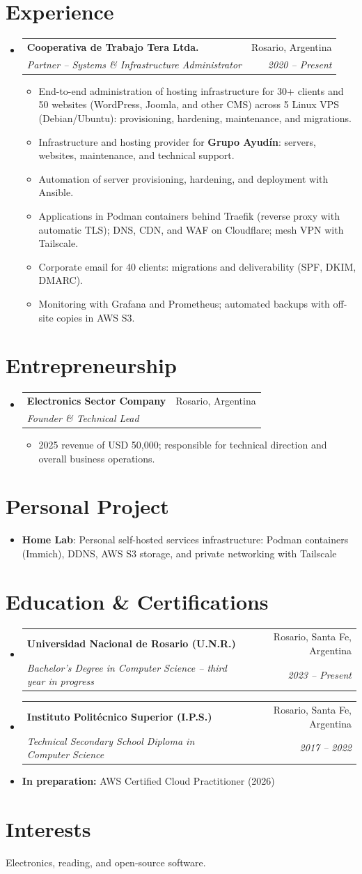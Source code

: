 \documentclass[letterpaper,10pt]{article}
\makeatletter
\newcommand{\resumeItem}[2]{
	\item\small{
		\textbf{#1}{: #2 \vspace{0.5mm}}
	}
}
\newcommand{\resumeItemx}[2]{
	\item\small{
		\textbf{#1}{#2 \vspace{0.5mm}}
	}
}
\newcommand{\resumeSubheading}[4]{
	\vspace{0.5mm}\item
	\begin{tabular*}{0.97\textwidth}[t]{l@{\extracolsep{\fill}}r}
		\textbf{#1} & #2 \vspace{0.5mm}\\
		\textit{\small#3} & \textit{\small #4} \\
	\end{tabular*}\vspace{0.5mm}
}
\newcommand{\resumeSubItem}[2]{\resumeItem{#1}{#2}\vspace{1pt}}
\newcommand{\resumeSubHeadingListStart}{\begin{itemize}[leftmargin=*]}
\newcommand{\resumeSubHeadingListEnd}{\end{itemize}\vspace{-4mm}}
\newcommand{\resumeItemListStart}{\begin{itemize}\vspace{-2pt}}
\newcommand{\resumeItemListEnd}{\end{itemize}\vspace{-2mm}}
\makeatother
\begin{document}
\section{Experience}
\resumeSubHeadingListStart
\resumeSubheading{Cooperativa de Trabajo Tera Ltda.}{Rosario, Argentina}{Partner -- Systems \& Infrastructure Administrator}{2020 -- Present}
\resumeItemListStart
\resumeItemx{}{End-to-end administration of hosting infrastructure for 30+ clients and 50 websites (WordPress, Joomla, and other CMS) across 5 Linux VPS (Debian/Ubuntu): provisioning, hardening, maintenance, and migrations.}
\resumeItemx{}{Infrastructure and hosting provider for \textbf{Grupo Ayudín}: servers, websites, maintenance, and technical support.}
\resumeItemx{}{Automation of server provisioning, hardening, and deployment with Ansible.}
\resumeItemx{}{Applications in Podman containers behind Traefik (reverse proxy with automatic TLS); DNS, CDN, and WAF on Cloudflare; mesh VPN with Tailscale.}
\resumeItemx{}{Corporate email for 40 clients: migrations and deliverability (SPF, DKIM, DMARC).}
\resumeItemx{}{Monitoring with Grafana and Prometheus; automated backups with off-site copies in AWS S3.}
\resumeItemListEnd
\resumeSubHeadingListEnd

\section{Entrepreneurship}
\resumeSubHeadingListStart
\resumeSubheading{Electronics Sector Company}{Rosario, Argentina}{Founder \& Technical Lead}{}
\resumeItemListStart
\resumeItemx{}{2025 revenue of USD 50,000; responsible for technical direction and overall business operations.}
\resumeItemListEnd
\resumeSubHeadingListEnd

\section{Personal Project}
\resumeSubHeadingListStart
\resumeSubItem{Home Lab}{Personal self-hosted services infrastructure: Podman containers (Immich), DDNS, AWS S3 storage, and private networking with Tailscale}
\resumeSubHeadingListEnd

\section{Education \& Certifications}
\resumeSubHeadingListStart
\resumeSubheading
{Universidad Nacional de Rosario (U.N.R.)}{Rosario, Santa Fe, Argentina}
{Bachelor's Degree in Computer Science -- third year in progress}{2023 -- Present}
\resumeSubheading
{Instituto Politécnico Superior (I.P.S.)}{Rosario, Santa Fe, Argentina}
{Technical Secondary School Diploma in Computer Science}{2017 -- 2022}
\resumeItemx{}{\textbf{In preparation:} AWS Certified Cloud Practitioner (2026)}
\resumeSubHeadingListEnd

\section{Interests}
\small{Electronics, reading, and open-source software.}

\end{document}
